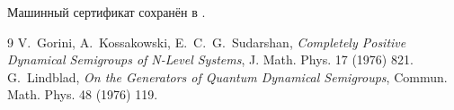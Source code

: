 Машинный сертификат сохранён в
.

\begin{thebibliography}{9}
 V.~Gorini, A.~Kossakowski,
E.~C.~G.~Sudarshan, \emph{Completely Positive Dynamical Semigroups of
N-Level Systems}, J. Math. Phys. 17 (1976) 821.
 G.~Lindblad,
\emph{On the Generators of Quantum Dynamical Semigroups},
Commun. Math. Phys. 48 (1976) 119.
\end{thebibliography}